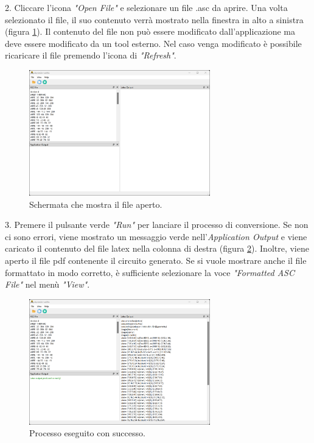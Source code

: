 2. Cliccare l'icona \textit{"Open File"} e selezionare un file .asc da aprire. Una volta selezionato il file, il suo contenuto verrà mostrato nella finestra in alto a sinistra (figura \ref{fig:punto_2}). Il contenuto del file non può essere modificato dall'applicazione ma deve essere modificato da un tool esterno. Nel caso venga modificato è possibile ricaricare il file premendo l'icona di \textit{"Refresh"}.
\begin{figure}[h!]
	\centering
	\includegraphics[width=0.7\textwidth]{./ImageFiles/file aperto.png}
	\caption{Schermata che mostra il file aperto.}
	\label{fig:punto_2}
\end{figure}

3. Premere il pulsante verde \textit{"Run"} per lanciare il processo di conversione. Se non ci sono errori, viene mostrato un messaggio verde nell'\textit{Application Output} e viene caricato il contenuto del file latex nella colonna di destra (figura \ref{fig:punto_3}). Inoltre, viene aperto il file pdf contenente il circuito generato. Se si vuole mostrare anche il file formattato in modo corretto, è sufficiente selezionare la voce \textit{"Formatted ASC File"} nel menù \textit{"View"}.
\begin{figure}[h!]
	\centering
	\includegraphics[width=0.7\textwidth]{./ImageFiles/run con successo.png}
	\caption{Processo eseguito con successo.}
	\label{fig:punto_3}
\end{figure}

